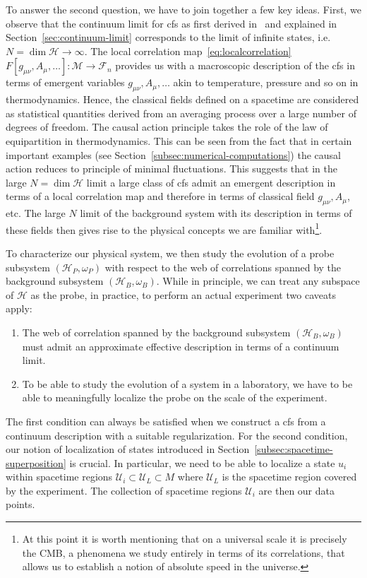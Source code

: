 \documentclass[reqno,11pt]{amsart}
\renewcommand{\H}{\mathcal{H}}
\newcommand{\F}{{\mathcal{F}}}
\numberwithin{equation}{section}
\begin{document}
To answer the second question, we have to join together a few key ideas.
First, we observe that the continuum limit for \ac{cfs} as first derived in~\cite{cfs} and explained in Section~\ref{sec:continuum-limit}
corresponds to the limit of infinite states, i.e.~$N = \dim \H \rightarrow \infty$.
The local correlation map~\eqref{eq:localcorrelation} $ F[g_{\mu\nu}, A_\mu,\dots]: \mathcal{M} \rightarrow \F_n$ provides us with a macroscopic
description of the \ac{cfs} in terms of emergent variables $g_{\mu\nu}, A_\mu, \dots$ akin to temperature, pressure and
so on in thermodynamics.
Hence, the classical fields defined on a spacetime are considered as statistical quantities derived from an averaging
process over a large number of degrees of freedom.
The causal action principle takes the role of the law of equipartition in thermodynamics.
This can be seen from the fact that in certain important examples (see Section~\ref{subsec:numerical-computations})
the causal action reduces to principle of minimal fluctuations.
This suggests that in the large $N = \dim\H$ limit a large class of \ac{cfs}
admit an emergent description in terms of a local correlation map and therefore in terms of classical field $g_{\mu \nu}, A_\mu$, etc.
The large $N$ limit of the background system with its description in terms of these fields then gives rise to the
physical concepts we are familiar with\footnote{
    At this point it is worth mentioning that on a universal scale it is precisely the CMB, a phenomena we study entirely
    in terms of its correlations, that allows us to establish a notion of absolute speed in the universe.
}.

To characterize our physical system, we then study the evolution of a probe subsystem $(\H_P, \omega_P)$ with respect to the
web of correlations spanned by the background subsystem $(\H_B, \omega_B)$.
While in principle, we can treat any subspace of $\H$ as the probe, in practice, to perform an actual experiment two caveats apply:
\begin{enumerate}
    \item The web of correlation spanned by the background subsystem $(\H_B, \omega_B)$ must admit an approximate effective description in terms of a continuum limit.
    \item To be able to study the evolution of a system in a laboratory, we have to be able to meaningfully localize the probe on the scale of the experiment.
\end{enumerate}

The first condition can always be satisfied when we construct a \ac{cfs} from a continuum description with a suitable regularization. 
For the second condition, our notion of localization of states introduced in Section~\ref{subsec:spacetime-superposition} is crucial.
In particular, we need to be able to localize a state $u_i$ within spacetime regions $\mathcal{U}_{i} \subset \mathcal{U}_L \subset M$
where $\mathcal{U}_L $ is the spacetime region covered by the experiment.
The collection of spacetime regions $\mathcal{U}_{i}$ are then our data points.
\end{document}
